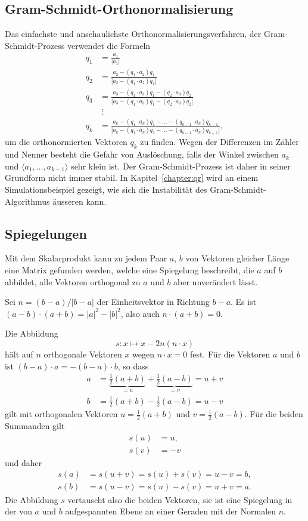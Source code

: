 \subsection{Gram-Schmidt-Orthonormalisierung
\label{buch:subsection:gram-schmidt}}
Das einfachste und anschaulichste Orthonormalisierungsverfahren, der
Gram-Schmidt-Prozess verwendet die Formeln
\begin{align*}
q_1 & = \frac{a_1}{|a_1|}
\\
q_2 &= \frac{
a_2 - (q_1\cdot a_2) q_1
}{
|a_2 - (q_1\cdot a_2) q_1|
}
\\
q_3 &= \frac{
a_3 - (q_1\cdot a_3) q_1 - (q_2\cdot a_3) q_2
}{
|a_3 - (q_1\cdot a_3) q_1 - (q_2\cdot a_3) q_2|
}
\\
&\;\vdots\\
q_k
&=\frac{
a_k - (q_1\cdot a_k) q_1 -\dots- (q_{k-1}\cdot a_k) q_{k-1}
}{|
a_k - (q_1\cdot a_k) q_1 -\dots- (q_{k-1}\cdot a_k) q_{k-1}
|},
\end{align*}
um die orthonormierten Vektoren $q_k$ zu finden.
Wegen der Differenzen im Zähler und Nenner besteht die Gefahr von
Auslöschung, falls der Winkel zwischen $a_k$ und
$\langle a_1,\dots,a_{k-1}\rangle$ sehr klein ist.
Der Gram-Schmidt-Prozess ist daher in seiner Grundform nicht immer stabil.
In Kapitel~\ref{chapter:qr} wird an einem Simulationsbeispiel gezeigt,
wie sich die Instabilität des Gram-Schmidt-Algorithmus äusseren kann.

\subsection{Spiegelungen
\label{buch:subsection:spiegelungn}}
Mit dem Skalarprodukt kann zu jedem Paar $a$, $b$ von Vektoren 
gleicher Länge eine Matrix gefunden werden, welche eine Spiegelung
beschreibt, die $a$ auf $b$ abbildet, alle Vektoren orthogonal zu
$a$ und $b$ aber unverändert lässt.

Sei $n=(b-a)/|b-a|$ der Einheitsvektor in Richtung $b-a$.
Es ist $(a-b)\cdot (a+b) = |a|^2 - |b|^2$, also auch $n\cdot (a+b)=0$.

Die Abbildung
\[
s:
x\mapsto  x - 2 n(n\cdot x) 
\]
hält auf $n$ orthogonale Vektoren $x$ wegen $n\cdot x=0$ fest.
Für die Vektoren $a$ und $b$ ist $(b-a)\cdot a= -(b-a)\cdot b$, so
dass
\begin{align*}
a
&=
\underbrace{\frac12(a+b)}_{\displaystyle =u}
+
\underbrace{\frac12(a-b)}_{\displaystyle=v}
=
u+v
\\
b&= \frac12(a+b) - \frac12(a-b) = u - v
\end{align*}
gilt mit orthogonalen Vektoren $u=\frac12(a+b)$ und $v=\frac12(a-b)$.
Für die beiden Summanden gilt
\begin{align*}
s(u) &= u,\\
s(v) &= -v
\end{align*}
und daher
\begin{align*}
s(a)
&=
s(u+v)=s(u)+s(v)=u-v = b,
\\
s(b)
&=
s(u-v)=s(u)-s(v)=u+v = a.
\end{align*}
Die Abbildung $s$ vertauscht also die beiden Vektoren, sie ist eine
Spiegelung in der von $a$ und $b$ aufgespannten Ebene an einer
Geraden mit der Normalen $n$.

